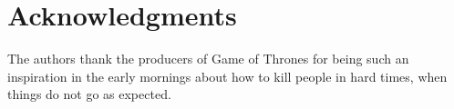 \documentclass[10pt,conference,compsocconf]{IEEEtran}
\begin{document}
\section*{Acknowledgments}
The authors thank the producers of Game of Thrones for being such an inspiration in the early mornings about how to kill people in hard times, when things do not go as expected.



\end{document}
